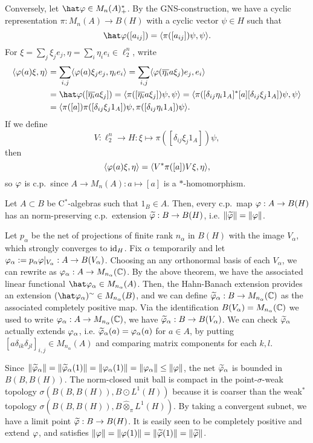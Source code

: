 \documentclass{../../../small}
\begin{document}
\begin{pf}
Conversely, let $\hat\f\in M_n(A)^*_+$.
By the GNS-construction, we have a cyclic representation $\pi:M_n(A)\to B(H)$ with a cyclic vector $\psi\in H$ such that
\[\hat\f([a_{ij}])=\<\pi([a_{ij}])\psi,\psi\>.\]
For $\xi=\sum_j\xi_je_j,\eta=\sum_i\eta_ie_i\in\ell_2^n$, write
\begin{align*}
\<\f(a)\xi,\eta\>
&=\sum_{i,j}\<\f(a)\xi_je_j,\eta_ie_i\>
=\sum_{i,j}\<\f(\bar{\eta_i}a\xi_j)e_j,e_i\>\\
&=\hat\f([\bar{\eta_i}a\xi_j])
=\<\pi([\bar{\eta_i}a\xi_j])\psi,\psi\>
=\<\pi([\delta_{ij}\eta_i1_ A]^*[a][\delta_{ij}\xi_j1_ A])\psi,\psi\>\\
&=\<\pi([a])\pi([\delta_{ij}\xi_j1_ A])\psi,\pi([\delta_{ij}\eta_i1_ A])\psi\>.
\end{align*}
If we define
\[V:\ell_2^n\to H:\xi\mapsto\pi([\delta_{ij}\xi_j1_ A])\psi,\]
then
\[\langle\varphi(a)\xi,\eta\rangle=\langle V^*\pi([a])V\xi,\eta\rangle,\]
so $\varphi$ is c.p.~since $A\to M_n(A):a\mapsto[a]$ is a $*$-homomorphism.
\end{pf}

\begin{thm}
Let $A\subset B$ be C$^*$-algebras such that $1_ B\in A$.
Then, every c.p.~map $\varphi:A\to B(H)$ has an norm-preserving c.p.~extension $\widetilde{\varphi}: B\to B(H)$, i.e. $\|\widetilde{\varphi}\|=\|\varphi\|$.
\end{thm}
\begin{pf}
Let $p_\alpha$ be the net of projections of finite rank $n_\alpha$ in $B(H)$ with the image $V_\alpha$, which strongly converges to $\operatorname{id}_H$.
Fix $\alpha$ temporarily and let $\varphi_\alpha:=p_\alpha\varphi|_{V_\alpha}:A\to B(V_\alpha)$.
Choosing an any orthonormal basis of each $V_\alpha$, we can rewrite as $\varphi_\alpha:A\to M_{n_\alpha}(\mathbb{C})$.
By the above theorem, we have the associated linear functional $\hat\f_\alpha\in M_{n_\alpha}(A)$.
Then, the Hahn-Banach extension provides an extension $(\hat\f_\alpha)^\sim\in M_{n_\alpha}(B)$, and we can define $\widetilde{\varphi}_\alpha: B\to M_{n_\alpha}(\mathbb{C})$ as the associated completely positive map.
Via the identification $B(V_\alpha)=M_{n_\alpha}(\mathbb{C})$ we used to write $\varphi_\alpha:A\to M_{n_\alpha}(\mathbb{C})$, we have $\widetilde{\varphi}_\alpha: B\to B(V_\alpha)$.
We can check $\widetilde{\varphi}_\alpha$ actually extends $\varphi_\alpha$, i.e. $\widetilde{\varphi}_\alpha(a)=\varphi_\alpha(a)$ for $a\in A$, by putting $[a\delta_{ik}\delta_{jl}]_{i,j}\in M_{n_\alpha}(A)$ and comparing matrix components for each $k,l$.

Since $\|\widetilde{\varphi}_\alpha\|=\|\widetilde{\varphi}_\alpha(1)\|=\|\varphi_\alpha(1)\|=\|\varphi_\alpha\|\le\|\varphi\|$, the net $\widetilde{\varphi}_\alpha$ is bounded in $B(B,B(H))$.
The norm-closed unit ball is compact in the point-$\sigma$-weak topology $\sigma(B(B,B(H)), B\odot L^1(H))$ because it is coarser than the weak$^*$ topology $\sigma(B(B,B(H)), B\hat\otimes_\pi L^1(H))$.
By taking a convergent subnet, we have a limit point $\widetilde{\varphi}: B\to B(H)$.
It is easily seen to be completely positive and extend $\varphi$, and satisfies $\|\varphi\|=\|\varphi(1)\|=\|\widetilde{\varphi}(1)\|=\|\widetilde{\varphi}\|$.
\end{pf}
\end{document}
